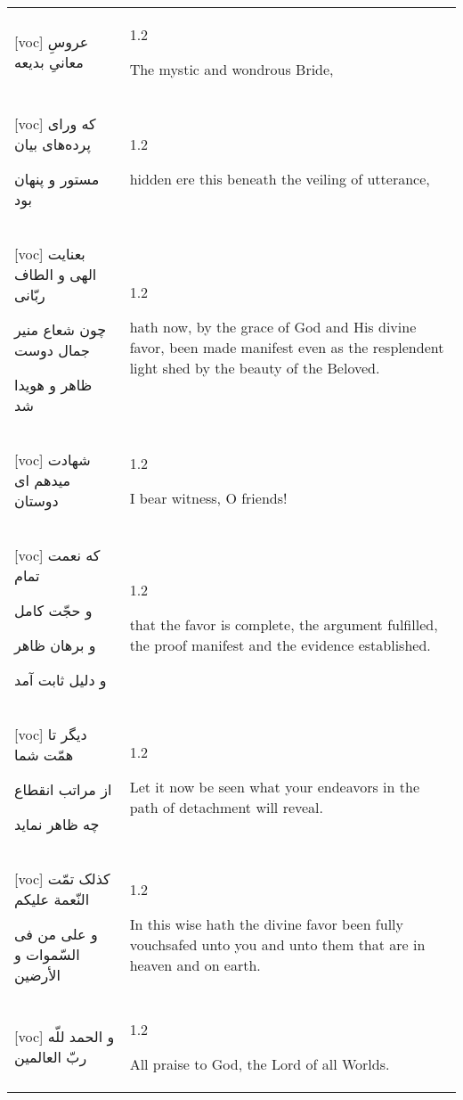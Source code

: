 \documentclass[11pt]{article}
\makeatletter
\newenvironment{orig}
  {\begin{farsi}[voc]}
  {\end{farsi}}
\newenvironment{trans}
  {\Large\begin{spacing}{1.2}\raggedright}
  {\end{spacing}}
\newenvironment{word}
  {\begin{tabular}[t]{p{2.75in}@{\hspace{3em}}p{2.75in}}}
  {\end{tabular}}
\newcommand{\ayat}[2]{\begin{orig}#1\end{orig} & \begin{trans}#2\end{trans}}
\makeatother
\begin{document}
\pagebreak

\begin{word}
\ayat{
عروسِ معانیِ بديعه
}{The mystic and wondrous Bride,} \\ \ayat{
که ورای پرده‌های بيان

مستور و پنهان بود
}{hidden ere this beneath the veiling of utterance,} \\ \ayat{
بعنايت الهی و الطاف ربّانی

چون شعاع منير جمال دوست

ظاهر و هويدا شد
}{hath now, by the grace of God and His divine favor, been made manifest
  even as the resplendent light shed by the beauty of the Beloved.} \\ \ayat{
شهادت ميدهم ای دوستان
}{I bear witness, O friends!} \\ \ayat{
که نعمت تمام

و حجّت کامل

و برهان ظاهر

و دليل ثابت آمد
}{that the favor is complete, the argument fulfilled, the proof manifest
  and the evidence established.} \\ \ayat{
ديگر تا همّت شما

از مراتب انقطاع

چه ظاهر نمايد
}{Let it now be seen what your endeavors in the path of detachment will
  reveal.} \\ \ayat{
کذلک تمّت النّعمة عليکم

و علی من فی السّموات و الأرضين
}{In this wise hath the divine favor been fully vouchsafed unto you and
  unto them that are in heaven and on earth.} \\ \ayat{
و الحمد للّه ربّ العالمين
}{All praise to God, the Lord of all Worlds.}
\end{word}
\end{document}

